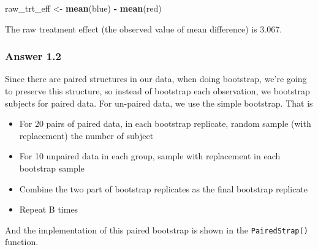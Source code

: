 \documentclass[
]{article}
\newenvironment{Shaded}{\begin{snugshade}}{\end{snugshade}}
\newcommand{\FunctionTok}[1]{\textcolor[rgb]{0.13,0.29,0.53}{\textbf{#1}}}
\newcommand{\NormalTok}[1]{#1}
\newcommand{\OtherTok}[1]{\textcolor[rgb]{0.56,0.35,0.01}{#1}}
\newcommand{\SpecialCharTok}[1]{\textcolor[rgb]{0.81,0.36,0.00}{\textbf{#1}}}
\begin{document}
\begin{Shaded}
\begin{Highlighting}[]
\NormalTok{raw\_trt\_eff }\OtherTok{\textless{}{-}} \FunctionTok{mean}\NormalTok{(blue) }\SpecialCharTok{{-}} \FunctionTok{mean}\NormalTok{(red)}
\end{Highlighting}
\end{Shaded}

The raw treatment effect (the observed value of mean difference) is
3.067.

\hypertarget{answer-1.2}{%
\subsubsection{Answer 1.2}\label{answer-1.2}}

Since there are paired structures in our data, when doing bootstrap,
we're going to preserve this structure, so instead of bootstrap each
observation, we bootstrap subjects for paired data. For un-paired data,
we use the simple bootstrap. That is

\begin{itemize}
\item
  For 20 pairs of paired data, in each bootstrap replicate, random
  sample (with replacement) the number of subject
\item
  For 10 unpaired data in each group, sample with replacement in each
  bootstrap sample
\item
  Combine the two part of bootstrap replicates as the final bootstrap
  replicate
\item
  Repeat B times
\end{itemize}

And the implementation of this paired bootstrap is shown in the
\texttt{PairedStrap()} function.
\end{document}
